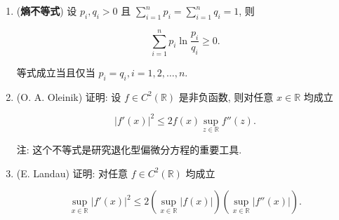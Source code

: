 \begin{enumerate}
    \item[1.](\textbf{熵不等式}) 设 $\displaystyle p_i, q_i > 0$ 且 $\displaystyle\sum_{i=1}^{n} p_i = \sum_{i=1}^{n} q_i = 1$, 则

\[\displaystyle \sum_{i=1}^{n} p_i \ln \frac{p_i}{q_i} \geq 0.\]

等式成立当且仅当 $\displaystyle p_i = q_i, i = 1, 2, \ldots, n$.
    \item[2.](O. A. Oleinik) 证明: 设 $\displaystyle f \in C^2(\mathbb{R})$ 是非负函数, 则对任意 $x \in \mathbb{R}$ 均成立

\[\displaystyle |f'(x)|^2 \leq 2f(x) \sup_{z \in \mathbb{R}} f''(z).\]

注: 这个不等式是研究退化型偏微分方程的重要工具.
    \item[3.](E. Landau) 证明: 对任意 $\displaystyle f \in C^2(\mathbb{R})$ 均成立

\[\displaystyle \sup_{x \in \mathbb{R}} |f'(x)|^2 \leq 2 \left( \sup_{x \in \mathbb{R}} |f(x)| \right) \left( \sup_{x \in \mathbb{R}} |f''(x)| \right).\]
\end{enumerate}
